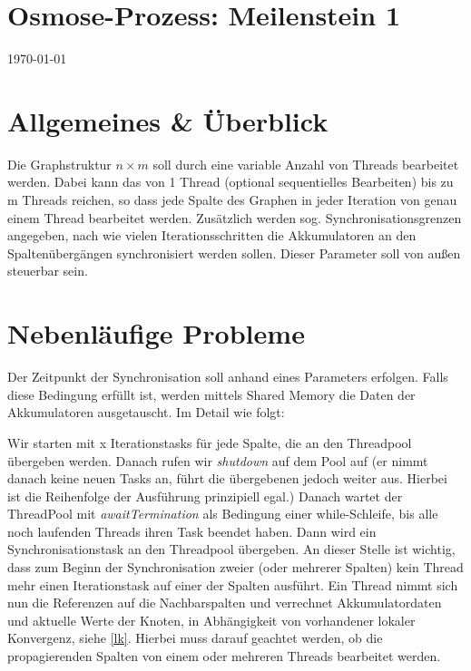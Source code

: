 
\usepackage{pdfpages}
\usepackage{listings}



\newcommand{\subttl}{\textbf{Milestone 1}}
\newcommand{\StudNameOne}{Christoph Rosenhauer (2549220)}
\newcommand{\StudNameTwo}{Lukas Schaal (2539218)}
\newcommand{\StudNameThree}{Jens Heinen (2542182)}


\section*{\centering Osmose-Prozess: Meilenstein 1}
\today

\section{Allgemeines \& Überblick}
Die Graphstruktur $n \times m$ soll durch eine variable Anzahl von Threads bearbeitet werden. Dabei kann das von 1 Thread (optional sequentielles Bearbeiten) bis zu m Threads reichen, so dass jede Spalte des Graphen in jeder Iteration von genau einem Thread bearbeitet werden. 
Zusätzlich werden sog. Synchronisationsgrenzen  angegeben, nach wie vielen Iterationsschritten die Akkumulatoren an den Spaltenübergängen synchronisiert werden sollen. Dieser Parameter soll von außen steuerbar sein. 

\section{Nebenläufige Probleme}
Der Zeitpunkt der Synchronisation soll anhand eines Parameters erfolgen. Falls diese Bedingung erfüllt ist, werden mittels Shared Memory die Daten der Akkumulatoren ausgetauscht. Im Detail wie folgt:

Wir starten mit x Iterationstasks für jede Spalte, die an den Threadpool übergeben werden. Danach rufen wir \textit{shutdown}  auf dem Pool auf (er nimmt danach keine neuen Tasks an, führt die übergebenen jedoch weiter aus. Hierbei ist die Reihenfolge der Ausführung prinzipiell egal.) Danach wartet der ThreadPool mit \textit{awaitTermination} als Bedingung einer while-Schleife, bis alle noch laufenden Threads ihren Task beendet haben.
Dann wird ein Synchronisationstask an den Threadpool übergeben. An dieser Stelle ist wichtig, dass zum Beginn der Synchronisation zweier (oder mehrerer Spalten) kein Thread mehr einen Iterationstask auf einer der Spalten ausführt. Ein Thread nimmt sich nun die Referenzen auf die Nachbarspalten und verrechnet Akkumulatordaten und aktuelle Werte der Knoten, in Abhängigkeit von vorhandener lokaler Konvergenz, siehe \ref{lk}. Hierbei muss darauf geachtet werden, ob die propagierenden Spalten von einem oder mehreren Threads bearbeitet werden.

